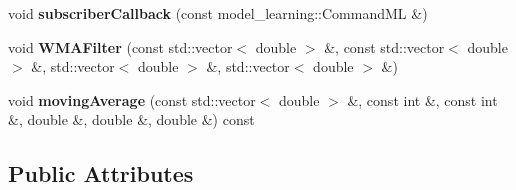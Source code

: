 \begin{DoxyCompactItemize}
void {\bfseries subscriber\+Callback} (const model\+\_\+learning\+::\+Command\+ML \&)
\item 
\mbox{\label{classarmcontroller_ac707c804ed04bcbf212c3c5456f4dffe}} 
void {\bfseries W\+M\+A\+Filter} (const std\+::vector$<$ double $>$ \&, const std\+::vector$<$ double $>$ \&, std\+::vector$<$ double $>$ \&, std\+::vector$<$ double $>$ \&)
\item 
\mbox{\label{classarmcontroller_adbe2ad7337bc5ac6c31502def583ed3a}} 
void {\bfseries moving\+Average} (const std\+::vector$<$ double $>$ \&, const int \&, const int \&, double \&, double \&, double \&) const
\end{DoxyCompactItemize}
\subsection*{Public Attributes}
